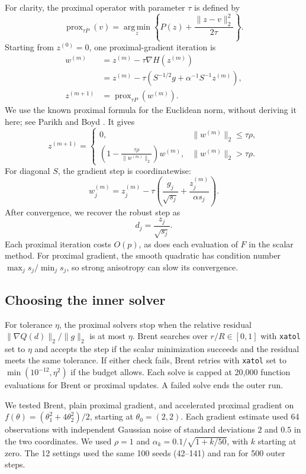 \documentclass[11pt,a4paper]{article}
\begin{document}
For clarity, the proximal operator with parameter $\tau$ is defined by
\[
    \operatorname{prox}_{\tau P}(v)
    =\operatorname*{arg\,min}_z
       \left\{P(z)+\frac{\|z-v\|_2^2}{2\tau}\right\}.
\]
Starting from $z^{(0)}=0$, one proximal-gradient iteration is
\begin{align*}
    w^{(m)}
      &=z^{(m)}-\tau\nabla H(z^{(m)})\\
      &=z^{(m)}-\tau
        \left(S^{-1/2}g+\alpha^{-1}S^{-1}z^{(m)}\right),\\
    z^{(m+1)}
      &=\operatorname{prox}_{\tau P}(w^{(m)}).
\end{align*}
We use the known proximal formula for the Euclidean norm, without
deriving it here; see Parikh and Boyd
\cite[Section~6.5.1]{parikh-boyd}. It gives
\[
    z^{(m+1)}=
    \begin{cases}
        0, & \|w^{(m)}\|_2\leq\tau\rho,\\[2pt]
        \displaystyle
        \left(1-\frac{\tau\rho}{\|w^{(m)}\|_2}\right)w^{(m)},
           & \|w^{(m)}\|_2>\tau\rho.
    \end{cases}
\]
For diagonal $S$, the gradient step is coordinatewise:
\[
    w_j^{(m)}=z_j^{(m)}-\tau
       \left(\frac{g_j}{\sqrt{s_j}}+
             \frac{z_j^{(m)}}{\alpha s_j}\right).
\]
After convergence, we recover the robust step as
\[
    d_j=\frac{z_j}{\sqrt{s_j}}.
\]
Each proximal iteration costs $O(p)$, as does each evaluation of $F$
in the scalar method. For proximal gradient, the smooth quadratic has
condition number $\max_j s_j/\min_j s_j$, so strong anisotropy can slow
its convergence.

\subsection*{Choosing the inner solver}

For tolerance $\eta$, the proximal solvers stop when the relative
residual $\|\nabla Q(d)\|_2/\|g\|_2$ is at most $\eta$. Brent searches
over $r/R\in[0,1]$ with \texttt{xatol} set to $\eta$ and accepts the
step if the scalar minimization succeeds and the residual meets the
same tolerance. If either check fails, Brent retries with
\texttt{xatol} set to $\min(10^{-12},\eta^2)$ if the budget allows.
Each solve is capped at 20{,}000 function evaluations for Brent or
proximal updates. A failed solve ends the outer run.

We tested Brent, plain proximal gradient, and accelerated proximal gradient
on $f(\theta)=(\theta_1^2+4\theta_2^2)/2$, starting at $\theta_0=(2,2)$.
Each gradient estimate used 64 observations with independent Gaussian
noise of standard deviations $2$ and $0.5$ in the two coordinates.
We used $\rho=1$ and $\alpha_k=0.1/\sqrt{1+k/50}$, with $k$ starting at zero.
The 12 settings used the same 100 seeds (42--141) and ran for 500 outer steps.
\end{document}
